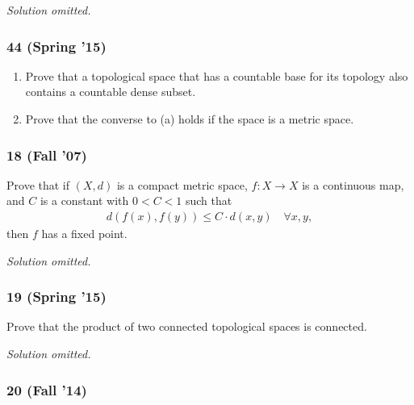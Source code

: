 \emph{Solution omitted.}

\hypertarget{spring-15-1}{%
\subsubsection{44 (Spring '15)}\label{spring-15-1}}

\begin{problem}[?]

\begin{enumerate}
\def\labelenumi{\alph{enumi}.}
\item
  Prove that a topological space that has a countable base for its
  topology also contains a countable dense subset.
\item
  Prove that the converse to (a) holds if the space is a metric space.
\end{enumerate}

\end{problem}

\hypertarget{fall-07-1}{%
\subsubsection{18 (Fall '07)}\label{fall-07-1}}

\begin{problem}[?]

Prove that if \((X, d)\) is a compact metric space, \(f : X \to X\) is a
continuous map, and \(C\) is a constant with \(0 < C < 1\) such that
\begin{align*}
d(f (x), f (y)) \leq C \cdot d(x, y) \quad \forall x, y
,\end{align*}
then \(f\) has a fixed point.

\end{problem}

\emph{Solution omitted.}

\hypertarget{spring-15-2}{%
\subsubsection{19 (Spring '15)}\label{spring-15-2}}

\begin{problem}[?]

Prove that the product of two connected topological spaces is connected.

\end{problem}

\emph{Solution omitted.}

\hypertarget{fall-14-1}{%
\subsubsection{20 (Fall '14)}\label{fall-14-1}}

